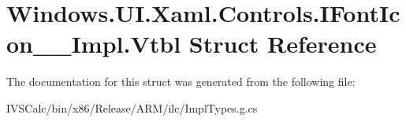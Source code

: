 \hypertarget{struct_windows_1_1_u_i_1_1_xaml_1_1_controls_1_1_i_font_icon_____impl_1_1_vtbl}{}\section{Windows.\+U\+I.\+Xaml.\+Controls.\+I\+Font\+Icon\+\_\+\+\_\+\+Impl.\+Vtbl Struct Reference}
\label{struct_windows_1_1_u_i_1_1_xaml_1_1_controls_1_1_i_font_icon_____impl_1_1_vtbl}


The documentation for this struct was generated from the following file\+:\begin{DoxyCompactItemize}
\item 
I\+V\+S\+Calc/bin/x86/\+Release/\+A\+R\+M/ilc/Impl\+Types.\+g.\+cs\end{DoxyCompactItemize}
